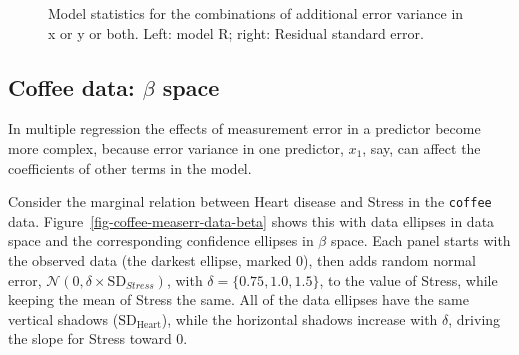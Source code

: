 \documentclass[
  letterpaper,
  10pt,
  krantz2]{krantz}
\begin{document}
\begin{figure}[H]


\caption{\label{fig-measerr-stats}Model statistics for the combinations
of additional error variance in x or y or both. Left: model R; right:
Residual standard error.}

\end{figure}%

\subsection{\texorpdfstring{Coffee data: \(\beta\)
space}{Coffee data: \textbackslash beta space}}\label{coffee-data-beta-space}

In multiple regression the effects of measurement error in a predictor
become more complex, because error variance in one predictor, \(x_1\),
say, can affect the coefficients of other terms in the model.

Consider the marginal relation between Heart disease and Stress in the
\texttt{coffee} data. Figure~\ref{fig-coffee-measerr-data-beta} shows
this with data ellipses in data space and the corresponding confidence
ellipses in \(\beta\) space. Each panel starts with the observed data
(the darkest ellipse, marked \(0\)), then adds random normal error,
\(\mathcal{N}(0, \delta \times \mathrm{SD}_{Stress})\), with
\(\delta = \{0.75, 1.0, 1.5\}\), to the value of Stress, while keeping
the mean of Stress the same. All of the data ellipses have the same
vertical shadows (\(\text{SD}_{\textrm{Heart}}\)), while the horizontal
shadows increase with \(\delta\), driving the slope for Stress toward 0.
\end{document}
